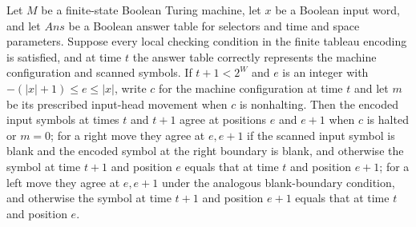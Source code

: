 \begin{theorem}
\label{Complexity.Meyer.in_edge}
\leanok
{}
Let $M$ be a finite-state Boolean Turing machine, let $x$ be a Boolean input word, and
let $Ans$ be a Boolean answer table for selectors and time and space parameters. Suppose
every local checking condition in the finite tableau encoding is satisfied, and at time
$t$ the answer table correctly represents the machine configuration and scanned symbols.
If $t+1<2^W$ and $e$ is an integer with $-(|x|+1)\le e\le |x|$, write $c$ for the
machine configuration at time $t$ and let $m$ be its prescribed input-head movement when
$c$ is nonhalting. Then the encoded input symbols at times $t$ and $t+1$ agree at
positions $e$ and $e+1$ when $c$ is halted or $m=0$; for a right move they agree at
$e,e+1$ if the scanned input symbol is blank and the encoded symbol at the right
boundary is blank, and otherwise the symbol at time $t+1$ and position $e$ equals that
at time $t$ and position $e+1$; for a left move they agree at $e,e+1$ under the
analogous blank-boundary condition, and otherwise the symbol at time $t+1$ and position
$e+1$ equals that at time $t$ and position $e$.
\end{theorem}


